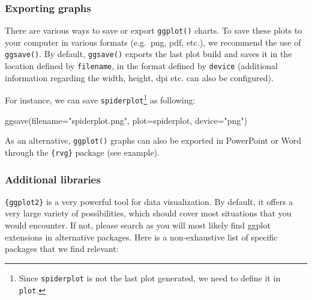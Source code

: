 \documentclass[
]{book}
\newenvironment{Shaded}{\begin{snugshade}}{\end{snugshade}}
\newcommand{\AttributeTok}[1]{\textcolor[rgb]{0.77,0.63,0.00}{#1}}
\newcommand{\FunctionTok}[1]{\textcolor[rgb]{0.00,0.00,0.00}{#1}}
\newcommand{\NormalTok}[1]{#1}
\newcommand{\StringTok}[1]{\textcolor[rgb]{0.31,0.60,0.02}{#1}}
\begin{document}
\hypertarget{exporting-graphs}{%
\subsubsection{Exporting graphs}\label{exporting-graphs}}

There are various ways to save or export \texttt{ggplot()} charts. To save these plots to your computer in various formats (e.g.~png, pdf, etc.), we recommend the use of \texttt{ggsave()}. By default, \texttt{ggsave()} exports the last plot build and saves it in the location defined by \texttt{filename}, in the format defined by \texttt{device} (additional information regarding the width, height, dpi etc. can also be configured).

For instance, we can save \texttt{spiderplot}\footnote{Since \texttt{spiderplot} is not the last plot generated, we need to define it in \texttt{plot}.} as following:

\begin{Shaded}
\begin{Highlighting}[]
\FunctionTok{ggsave}\NormalTok{(}\AttributeTok{filename=}\StringTok{"spiderplot.png"}\NormalTok{, }\AttributeTok{plot=}\NormalTok{spiderplot, }\AttributeTok{device=}\StringTok{"png"}\NormalTok{)}
\end{Highlighting}
\end{Shaded}

As an alternative, \texttt{ggplot()} graphs can also be exported in PowerPoint or Word through the \texttt{\{rvg\}} package (see example).

\hypertarget{additional-libraries}{%
\subsubsection{Additional libraries}\label{additional-libraries}}

\texttt{\{ggplot2\}} is a very powerful tool for data visualization. By default, it offers a very large variety of possibilities, which should cover most situations that you would encounter. If not, please search as you will most likely find ggplot extensions in alternative packages. Here is a non-exhaustive list of specific packages that we find relevant:
\end{document}
